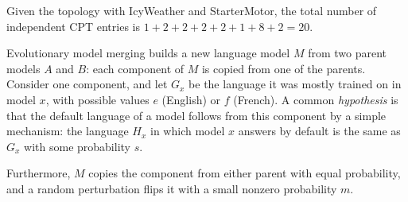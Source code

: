 \documentclass[11pt, a4paper]{exam}
\begin{document}
\begin{exercises}[1, 2][5]
\begin{parts}
    \begin{solution}
        Given the topology with IcyWeather and StarterMotor, the total number of independent CPT entries is $1 + 2 + 2 + 2 + 2 + 1 + 8 + 2 = 20$.
    \end{solution}
\end{parts}


Evolutionary model merging builds a new language model $M$ from two parent models $A$ and $B$: each component of $M$ is copied from one of the parents. Consider one component, and let $G_x$ be the language it was mostly trained on in model $x$, with possible values $e$ (English) or $f$ (French). A common \emph{hypothesis} is that the default language of a model follows from this component by a simple mechanism: the language $H_x$ in which model $x$ answers by default is the same as $G_x$ with some probability $s$.

Furthermore, $M$ copies the component from either parent with equal probability, and a random perturbation flips it with a small nonzero probability $m$.

\end{exercises}
\end{document}
